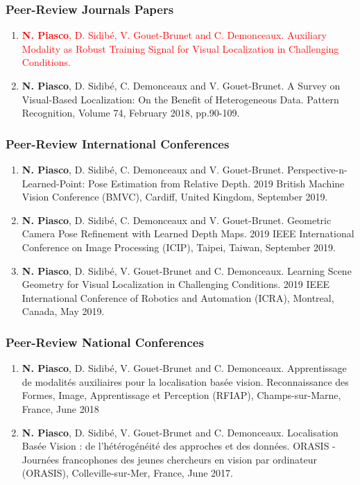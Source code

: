 \begin{publication}

\subsubsection*{Peer-Review Journals Papers}

\begin{enumerate}\scriptsize
	\item \textcolor{red}{\textbf{N. Piasco}, D. Sidib\'e, V. Gouet-Brunet and C. Demonceaux. Auxiliary Modality as Robust Training Signal for
Visual Localization in Challenging Conditions.}
	\item \textbf{N. Piasco}, D. Sidib\'e, C. Demonceaux and V. Gouet-Brunet. A Survey on Visual-Based Localization: On the Benefit of Heterogeneous Data. Pattern Recognition, Volume 74, February 2018, pp.90-109.
\end{enumerate}

\subsubsection*{Peer-Review International Conferences}

\begin{enumerate}\scriptsize
	\item \textbf{N. Piasco}, D. Sidib\'e, C. Demonceaux and V. Gouet-Brunet. Perspective-n-Learned-Point: Pose
Estimation from Relative Depth. 2019 British Machine Vision Conference (BMVC), Cardiff, United Kingdom, September 2019.
	\item \textbf{N. Piasco}, D. Sidib\'e, C. Demonceaux and V. Gouet-Brunet. Geometric Camera Pose Refinement with Learned Depth Maps. 2019 IEEE International Conference on Image Processing (ICIP), Taipei, Taiwan, September 2019.
	\item \textbf{N. Piasco}, D. Sidib\'e, V. Gouet-Brunet and C. Demonceaux. Learning Scene Geometry for Visual Localization in Challenging Conditions. 2019 IEEE International Conference of Robotics and Automation (ICRA), Montreal, Canada, May 2019.	
\end{enumerate}

\subsubsection*{Peer-Review National Conferences}

\begin{enumerate}\scriptsize
	\item \textbf{N. Piasco}, D. Sidib\'e, V. Gouet-Brunet and C. Demonceaux. Apprentissage de modalit\'es auxiliaires pour la localisation bas\'ee vision. Reconnaissance des Formes, Image, Apprentissage et Perception (RFIAP), Champs-sur-Marne, France, June 2018
	\item \textbf{N. Piasco}, D. Sidib\'e, V. Gouet-Brunet and C. Demonceaux. Localisation Bas\'ee Vision : de l’h\'et\'erog\'en\'eit\'e des approches et des données. ORASIS - Journ\'ees francophones des jeunes chercheurs en vision par ordinateur (ORASIS), Colleville-sur-Mer, France, June 2017.
\end{enumerate}


\end{publication}
